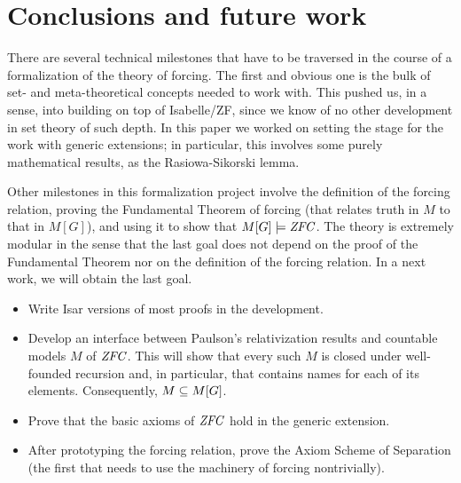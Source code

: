 \section{Conclusions and future work}
There are several technical milestones that have to be traversed in the
course of a formalization of the theory of forcing. The first and
obvious one is the bulk of set- and meta-theoretical concepts needed to work
with. This pushed us, in a sense,  into building on top of Isabelle/ZF,
since we know of no other development in set theory of such
depth. In this paper we worked on setting the stage for the work with
generic extensions; in particular, this involves some purely mathematical
results, as the Rasiowa-Sikorski lemma. 

Other milestones in this formalization project involve the definition
of the forcing relation, proving the Fundamental Theorem of forcing
(that relates truth in $M$ to that in $M[G]$), and using it to show
that $M[G]\models \mathit{ZFC}$. The theory is extremely modular in the sense
that the last goal does not depend on the proof of the Fundamental
Theorem nor on the definition of the forcing relation. In a next work,
we will obtain the last goal.

\begin{itemize}
\item Write Isar versions of most proofs in the development.
\item Develop an interface between Paulson's relativization results
  and countable models $M$ of $\mathit{ZFC}$. This will show
  that every such $M$ is closed under well-founded recursion and, in
  particular, that contains names for each of its
  elements. Consequently, $M\subseteq M[G]$.
\item Prove that the basic axioms of $\mathit{ZFC}$ hold in the generic
  extension. 
\item After prototyping the forcing relation, prove the Axiom Scheme
  of Separation (the first that needs to use the machinery of forcing
  nontrivially).
\end{itemize}

